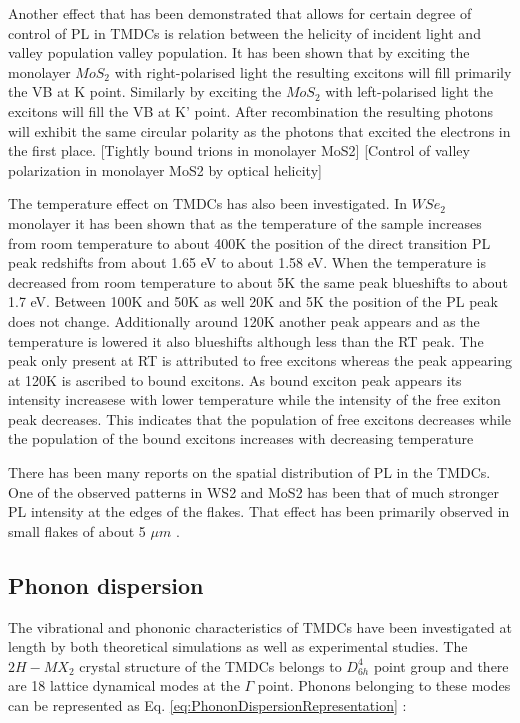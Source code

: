 \documentclass[12pt]{article}
\begin{document}
	Another effect that has been demonstrated that allows for certain degree of control of PL in TMDCs is relation between the helicity of incident light and valley population valley population. It has been shown that by exciting the monolayer $MoS_2$ with right-polarised light the resulting excitons will fill primarily the VB at K point. Similarly by exciting the $MoS_2$ with left-polarised light the excitons will fill the VB at K' point. After recombination the resulting photons will exhibit the same circular polarity as the photons that excited the electrons in the first place. [Tightly bound trions in monolayer MoS2] [Control of valley polarization in monolayer MoS2 by optical helicity]
	
	The temperature effect on TMDCs has also been investigated. In $WSe_2$ monolayer it has been shown that as the temperature of the sample increases from room temperature to about 400K the position of the direct transition PL peak redshifts from about 1.65 eV to about 1.58 eV. When the temperature is decreased from room temperature to about 5K the same peak blueshifts to about 1.7 eV. Between 100K and 50K as well 20K and 5K the position of the PL peak does not change. Additionally around 120K another peak appears and as the temperature is lowered it also blueshifts although less than the RT peak. The peak only present at RT is attributed to free excitons whereas the peak appearing at 120K is ascribed to bound excitons. As bound exciton peak appears its intensity increasese with lower temperature while the intensity of the free exiton peak decreases. This indicates that the population of free excitons decreases while the population of the bound excitons increases with decreasing temperature \cite{PhotoluminescencePropertiesAndExcitonDynamicsInMonolayerWSe2}
	
	There has been many reports on the spatial distribution of PL in the TMDCs. One of the observed patterns in WS2 and MoS2 has been that of much stronger PL intensity at the edges of the flakes. That effect has been primarily observed in small flakes of about 5 $\mu m$ \cite{ExtraordinaryRoomTemperaturePhotoluminescenceInTriangularWS2Monolayers}.
	
	\subsection{Phonon dispersion}
	
	The vibrational and phononic characteristics of TMDCs have been investigated at length by both theoretical simulations as well as experimental studies. The $2H-MX_2$ crystal structure of the TMDCs belongs to $D_{6h}^4$ point group and there are 18 lattice dynamical modes at the $\Gamma$ point. Phonons belonging to these modes can be represented as Eq. \ref{eq:PhononDispersionRepresentation} \cite{LatticeDynamicsInMono-AndFew-LayerSheetsOfWS2AndWSe2}: 
	
\end{document}
